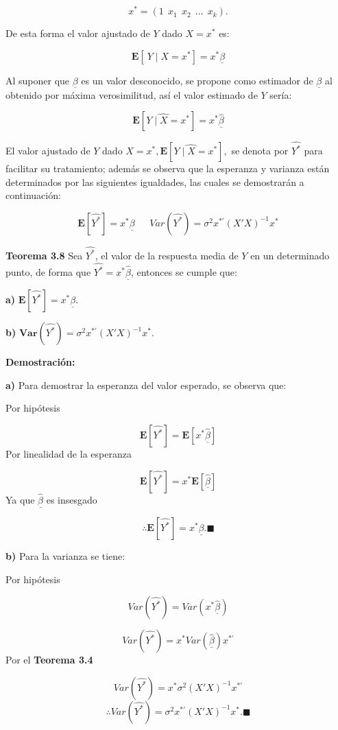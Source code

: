 \documentclass[
  a4paper,
  oneside,
  openany]{book}
\begin{document}
\[x^*= \left( 1 \ \ x_{1} \ \ x_{2} \ \ \ldots \ \ x_{k}\right).\]

De esta forma el valor ajustado de \(Y\) dado \(X=x^*\) es:

\[\mathbf{E}[ \ Y \mid X=x^*]=x^*\underline{\beta}\]

Al suponer que \(\underline{\beta}\) es un valor desconocido, se propone como estimador de \(\underline{\beta}\) al obtenido por máxima verosimilitud, así el valor estimado de \(Y\) sería:

\[\mathbf{E}\left[\widehat{Y \mid X =} x^*\right]=x^*\underline{\hat{\beta}}\]

El valor ajustado de \(Y\) dado \(X=x^*,\mathbf{E}\left[ \widehat{Y \mid X=} x^*\right],\) se denota por \(\hat{Y^*}\) para facilitar su tratamiento; además se observa que la esperanza y varianza están determinados por las siguientes igualdades, las cuales se demostrarán a continuación:

\[\mathbf{E}[\hat{Y^*}]= x^*\underline{\beta} \ \ \ \ \ \ \ Var(\hat{Y^*})=\sigma^2 x^{*'}(X'X)^{-1}x^*\]

\textbf{Teorema 3.8} Sea \(\hat{Y^*}\), el valor de la respuesta media de \(Y\) en un determinado punto, de forma que \(\hat{Y^*}=x^*\underline{\hat{\beta}}\), entonces se cumple que:

\textbf{a)} \(\mathbf{E}[\hat{Y^*}]= x^*\underline{\beta}.\)

\textbf{b)} \(\textbf{Var}(\hat{Y^*})=\sigma^2 x^{*'}(X'X)^{-1}x^*.\)

\textbf{Demostración:}

\textbf{a)} Para demostrar la esperanza del valor esperado, se observa que:

Por hipótesis

\[\mathbf{E}[\hat{Y^*}]=\mathbf{E}[x^*\underline{\hat{\beta}}]\]
Por linealidad de la esperanza

\[\mathbf{E}[\hat{Y^*}]=x^*\mathbf{E}[\underline{\hat{\beta}}]\]
Ya que \(\underline{\hat{\beta}}\) es insesgado

\[\therefore \mathbf{E}[\hat{Y^*}]= x^*\underline{\beta}.\blacksquare\]

\textbf{b)} Para la varianza se tiene:

Por hipótesis

\[Var(\hat{Y^*})=Var(x^*\underline{\hat{\beta}})\]

\[Var(\hat{Y^*})=x^*Var(\underline{\hat{\beta}})x^{*'}\]
Por el \textbf{Teorema 3.4}

\[Var(\hat{Y^*})=x^*\sigma^2(X'X)^{-1}x^{*'}\]
\[\therefore Var(\hat{Y^*})=\sigma^2 x^{*'}(X'X)^{-1}x^*.\blacksquare\]
\end{document}
